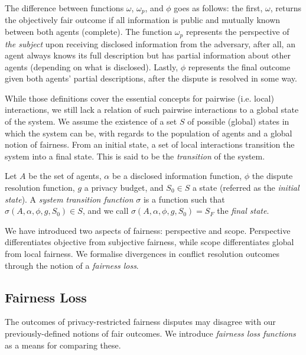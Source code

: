 \documentclass[acmsmall]{custom-arxiv}  %
\begin{document}
The difference between functions $\omega$, $\omega_p$, and $\phi$ goes as follows: the first, $\omega$, returns the objectively fair outcome if all information is public and mutually known between both agents (complete). The function $\omega_p$ represents the perspective of \textit{the subject} upon receiving disclosed information from the adversary, after all, an agent always knows its full description but has partial information about other agents (depending on what is disclosed). Lastly, $\phi$ represents the final outcome given both agents' partial descriptions, after the dispute is resolved in some way.

While those definitions cover the essential concepts for pairwise (i.e. local) interactions, we still lack a relation of such pairwise interactions to a global state of the system. We assume the existence of a set $S$ of possible (global) states in which the system can be, with regards to the population of agents and a global notion of fairness. From an initial state, a set of local interactions transition the system into a final state. This is said to be the \textit{transition} of the system. 

\begin{definition}
  Let $A$ be the set of agents, $\alpha$ be a disclosed information function, $\phi$ the dispute resolution function, $g$ a privacy budget, and $S_0 \in S$ a state (referred as the \textit{initial state}). A \textit{system transition function} $\sigma$ is a function such that $\sigma(A, \alpha, \phi, g, S_0) \in S$, and we call $\sigma(A, \alpha, \phi, g, S_0) = S_F$ the \textit{final state}.
\end{definition}

We have introduced two aspects of fairness: perspective and scope. Perspective differentiates objective from subjective fairness, while scope differentiates global from local fairness. We formalise divergences in conflict resolution outcomes through the notion of a \textit{fairness loss}.  

\subsection{Fairness Loss}

The outcomes of privacy-restricted fairness disputes may disagree with our previously-defined notions of fair outcomes. We introduce \textit{fairness loss functions} as a means for comparing these.
\end{document}
